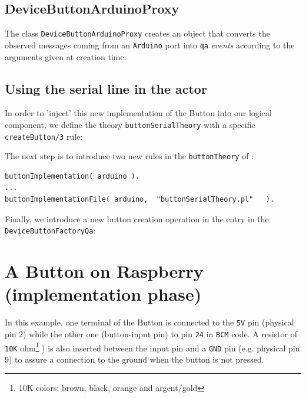 \subsection{DeviceButtonArduinoProxy}
The class \texttt{DeviceButtonArduinoProxy} creates an object that converts the observed messages coming from an \texttt{Arduino} port  into \texttt{qa} \textit{events} according to the arguments given at creation time:



\subsection{Using the serial line in the actor}
In order to 'inject' this new implementation of the Button into our logical component, we define the theory \texttt{buttonSerialTheory} with a specific \texttt{createButton/3} rule: 




The next step is to introduce two new rules in  the \texttt{buttonTheory} of :

\begin{lstlisting}
buttonImplementation( arduino ).
...
buttonImplementationFile( arduino,  "buttonSerialTheory.pl"   ).
\end{lstlisting}

Finally, we introduce a new button creation operation in the entry in the \texttt{DeviceButtonFactoryQa}:



 

\newpage 
\section{A Button on Raspberry (implementation phase)}
In this example, one terminal of the Button is connected to the \texttt{5V} pin (physical pin 2) while the other one (button-input pin) to pin \texttt{24} in \texttt{BCM} code. A resistor  of \texttt{10K} ohm\footnote{10K colors: brown, black, orange and argent/gold} )  is also inserted between the input pin and a \texttt{GND} pin (e.g. physical pin 9) to assure a connection to the ground when the button is not pressed.

